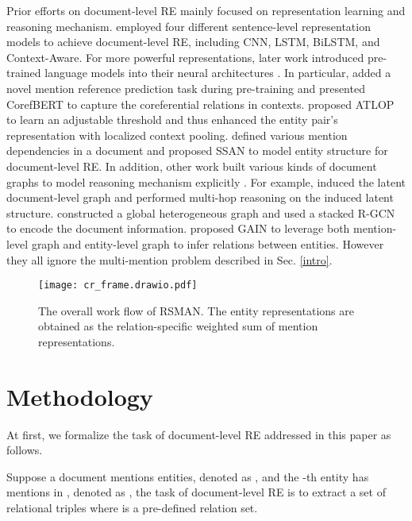 \documentclass[11pt]{article}
\begin{document}
Prior efforts on document-level RE mainly focused on representation learning and reasoning mechanism. \citet{yao-etal-2019-docred} employed four different sentence-level representation models to achieve document-level RE, including {CNN}, {LSTM}, {BiLSTM}, and {Context-Aware}. For more powerful representations, later work introduced pre-trained language models into their neural architectures \cite{ye-etal-2020-coreferential,zhou2021document,xu2021entity}. In particular, \citet{ye-etal-2020-coreferential} added a novel mention reference prediction task during pre-training and presented {CorefBERT} to capture the coreferential relations in contexts. \citet{zhou2021document} proposed {ATLOP} to learn an adjustable threshold and thus enhanced the entity pair's representation with localized context pooling. \citet{xu2021entity} defined various mention dependencies in a document and proposed {SSAN} to model entity structure for document-level RE. In addition, other work built various kinds of document graphs to model reasoning mechanism explicitly
\cite{nan-etal-2020-reasoning,zeng-etal-2020-double,wang-etal-2020-global}. For example, \citet{nan-etal-2020-reasoning} induced the latent document-level
graph and performed multi-hop reasoning on the induced latent structure. \citet{wang-etal-2020-global} constructed a global heterogeneous
graph and used a stacked R-GCN \cite{schlichtkrull2018modeling} to encode the document information. \citet{zeng-etal-2020-double} proposed {GAIN} to leverage both mention-level graph
and entity-level graph to infer relations between
entities. However they all ignore the multi-mention problem described in Sec. \ref{intro}.

\begin{figure*}[t]
\centering
    \texttt{[image: cr\_frame.drawio.pdf]}
\caption{The overall work flow of RSMAN. The entity representations are obtained as the relation-specific weighted sum of mention representations.} \label{overview}
\end{figure*}

\section{Methodology}

At first, we formalize the task of document-level RE addressed in this paper as follows.



Suppose a document  mentions  entities, denoted as , and the -th entity  has  mentions in , denoted as , the task of document-level RE is to extract a set of relational triples  where  is a pre-defined relation set.
\end{document}
